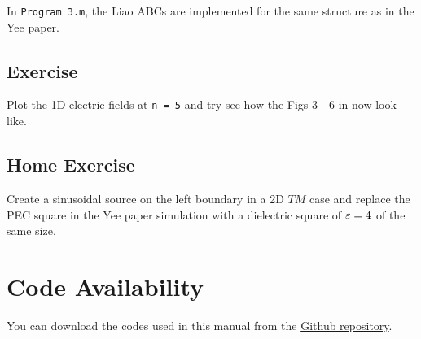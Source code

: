 \documentclass[12pt]{article}
\begin{document}
In \texttt{Program 3.m}, the Liao ABCs are implemented for the same structure as in the Yee paper. 


\subsection*{Exercise}

\begin{mdframed}[backgroundcolor=blue!20]
  Plot the 1D electric fields at \texttt{n = 5} and try see how the  Figs 3 - 6 in \cite{kane_yee_numerical_1966} now look like.
\end{mdframed}


\subsection*{Home Exercise}

\begin{mdframed}[backgroundcolor=blue!20]
Create a sinusoidal source on the left boundary in a 2D $TM$ case and replace the PEC square in the Yee paper simulation with a dielectric square of $\varepsilon = 4$ of the same size.
\end{mdframed}

\section{Code Availability}

You can download the codes used in this manual from the \href{https://github.com/hasantahir/HFCS-Labs}{Github repository}.



\end{document}
